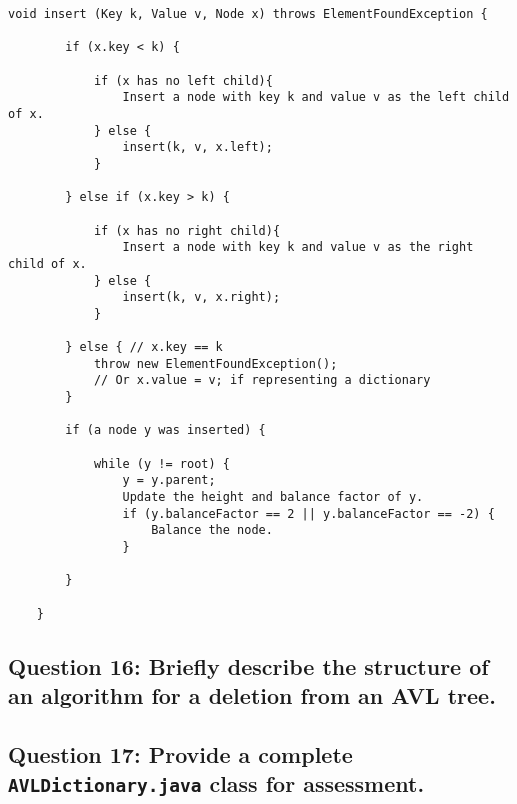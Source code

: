 \documentclass[a4paper, 12pt, titlepage]{article}
\def\code#1{\texttt{#1}}
\begin{document}
\begin{lstlisting}
void insert (Key k, Value v, Node x) throws ElementFoundException {

		if (x.key < k) {

			if (x has no left child){
				Insert a node with key k and value v as the left child of x.
			} else {
				insert(k, v, x.left);
			}

		} else if (x.key > k) {

			if (x has no right child){
				Insert a node with key k and value v as the right child of x.
			} else {
				insert(k, v, x.right);
			}

		} else { // x.key == k
			throw new ElementFoundException();
			// Or x.value = v; if representing a dictionary
		}

		if (a node y was inserted) {

			while (y != root) {
				y = y.parent;
				Update the height and balance factor of y.
				if (y.balanceFactor == 2 || y.balanceFactor == -2) {
					Balance the node.
				}

		}

	}
\end{lstlisting}

\subsection*{Question 16: Briefly describe the structure of an algorithm for a deletion from an AVL tree.} 

\subsection*{Question 17: Provide a complete \code{AVLDictionary.java} class for assessment.} 
\end{document}
